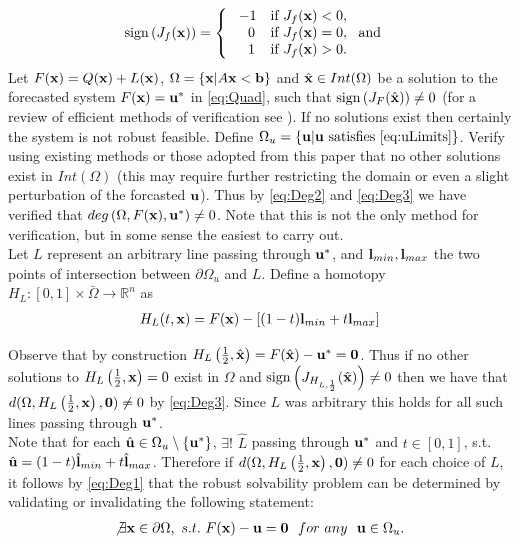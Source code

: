 \documentclass[11pt]{article}
\theoremstyle{plain}
\theoremstyle{definition}
\theoremstyle{remark}
\begin{document}
\[\operatorname{sign}\left(J_f(\bold x)\right)=   \left\{
\begin{array}{ll}
       \ -1   & \mbox{if } J_f(\bold x)< 0, \\
      \quad 0 & \mbox{if } J_f(\bold x)= 0,~\mbox{ and } \\
      \quad 1 & \mbox{if } J_f(\bold x)> 0. \\
\end{array} 
\right. \]
Let $F(\bold x)=Q(\bold x)+L(\bold x)$, $\Omega=\{\bold x| A\bold x< \bold b\}$ and $\hat{\bold x}\in Int(\Omega)$ be a solution to the forecasted system $F(\bold x)=\bold u^*$ in \ref{eq:Quad}, such that $\operatorname{sign}\left(J_{F}(\hat{\bold x})\right)\neq 0$ (for a review of efficient methods of verification see \cite{GRIEWANK2014}). 
If no solutions exist then certainly the system is not robust feasible. Define $\Omega_u=\{\bold u| \bold u\text{ satisfies }\ref{eq:uLimits}\}$.
Verify using existing methods or those adopted from this paper that no other solutions exist in $Int(\Omega)$ (this may require further restricting the domain or even a slight perturbation of the forcasted $\bold u$). 
Thus by \ref{eq:Deg2} and \ref{eq:Deg3} we have verified that $deg\left(\Omega, F(\bold x), \bold u^*\right)\neq 0$. 
Note that this is not the only method for verification, but in some sense the easiest to carry out. \\

Let $L$ represent an arbitrary line passing through $\bold u^*$, and $\bold l_{min},\bold l_{max}$ the two points of intersection between $\partial\Omega_u$ and $L$. 
Define a homotopy $H_L : [0,1]\times\bar{\Omega}\rightarrow\mathbb{R}^n$ as 
\begin{align}
H_L(t,\bold x) = F(\bold x)-\left[(1-t)\bold l_{min}+t\bold l_{max}\right] \label{eq:Homo}
\end{align}

Observe that by construction $H_L\left(\frac{1}{2},\hat{\bold x}\right)=F(\hat{\bold x})-\bold u^*=\textbf{0}$. 
Thus if no other solutions to $H_L\left(\frac{1}{2},\bold x\right)=0$ exist in $\Omega$ and $\operatorname{sign}\left(J_{H_{L,\frac{1}{2}}}(\hat{\bold x})\right)\neq 0$ then we have that $d(\Omega,H_L\left(\frac{1}{2},\bold x\right),\textbf{0})\neq 0$ by \ref{eq:Deg3}. 
Since $L$ was arbitrary this holds for all such lines passing through $\bold u^*$.\\
Note that for each $\hat{\bold u}\in\Omega_u\setminus\{\bold u^*\}$, $\exists !$ $\hat{L}$ passing through $\bold u^*$ and $t\in[0,1]$,  s.t. $\hat{\bold u}=(1-t)\hat{\bold l}_{min}+t\hat{\bold l}_{max}$. 
Therefore if $d(\Omega,H_L\left(\frac{1}{2},\bold x\right),\bold 0)\neq 0$ for each choice of $L$, it follows by \ref{eq:Deg1} that the robust solvability problem can be determined by validating or invalidating the following statement:
\begin{align}
\not\exists \bold x\in\partial\Omega, \ s.t. \ F(\bold x)-\bold u=\bold 0	 \ \ for \ any \ \ \bold u\in\Omega_u. \label{eq:RSForm}
\end{align}
\end{document}
